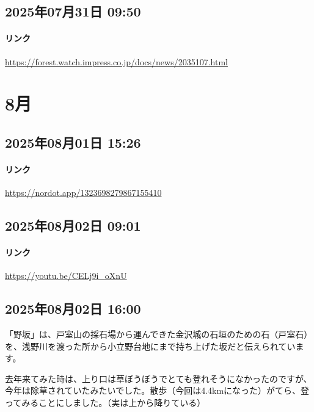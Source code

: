 \subsection*{2025年07月31日 09:50}

\paragraph{リンク}
\url{https://forest.watch.impress.co.jp/docs/news/2035107.html}

\section{8月}

\subsection*{2025年08月01日 15:26}

\paragraph{リンク}
\url{https://nordot.app/1323698279867155410}

\subsection*{2025年08月02日 09:01}

\paragraph{リンク}
\url{https://youtu.be/CELj9i_oXnU}

\subsection*{2025年08月02日 16:00}

「野坂」は、戸室山の採石場から運んできた金沢城の石垣のための石（戸室石）を、浅野川を渡った所から小立野台地にまで持ち上げた坂だと伝えられています。

去年来てみた時は、上り口は草ぼうぼうでとても登れそうになかったのですが、今年は除草されていたみたいでした。散歩（今回は4.4kmになった）がてら、登ってみることにしました。（実は上から降りている）

